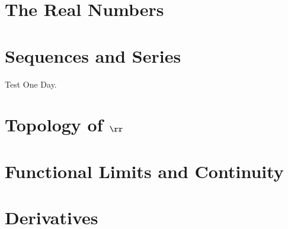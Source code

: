 \chapter{The Real Numbers}






\chapter{Sequences and Series}











Test One Day.



\chapter{Topology of $\rr$}









\chapter{Functional Limits and Continuity}







\chapter{Derivatives}






